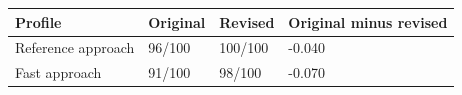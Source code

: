 \begin{tabular}{llll}
\toprule
Profile & Original & Revised & Original minus revised \\
\midrule
Reference approach & 96/100 & 100/100 & -0.040 \\
Fast approach & 91/100 & 98/100 & -0.070 \\
\bottomrule
\end{tabular}
